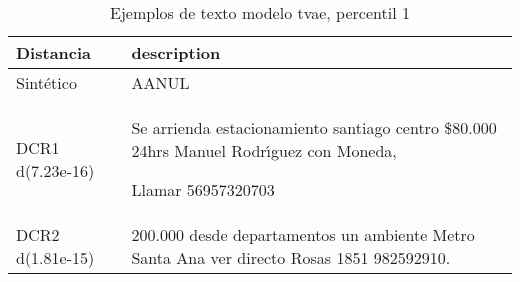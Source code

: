 \begin{table}[H]
\centering
\fontsize{10}{14}\selectfont
\caption{Ejemplos de texto modelo tvae, percentil 1}
\label{table-example-economicos-b-3-tvae-1p-text}
\begin{tabular}{|l|m{35em}|}
\hline
\rowcolor[gray]{0.8}
Distancia & description \\
\hline Sintético & AANUL \\
\hline DCR1 d(7.23e-16) & Se arrienda estacionamiento santiago centro \$80.000  24hrs 
Manuel Rodr{\'\i}guez  con Moneda, 

Llamar 56957320703 \\
\hline DCR2 d(1.81e-15) & 200.000 desde departamentos un ambiente Metro Santa Ana ver directo Rosas 1851 982592910. \\
\hline
\end{tabular}
\end{table}
